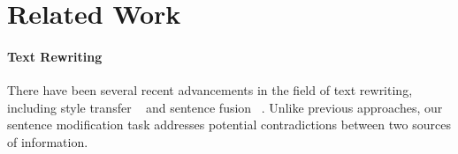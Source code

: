 \documentclass[letterpaper]{article} %
\begin{document}
\section{Related Work}
\label{sec:related_work}
\paragraph{Text Rewriting}

There have been several recent advancements in the field of text rewriting, including style transfer
~\cite{shen2017style,zhang2018style,chen-etal-2018-learning} and sentence fusion ~\cite{barzilay2005sentence,narayan-etal-2017-split,geva2019discofuse}. Unlike previous approaches, our sentence modification task addresses potential contradictions between two sources of information.
\end{document}
